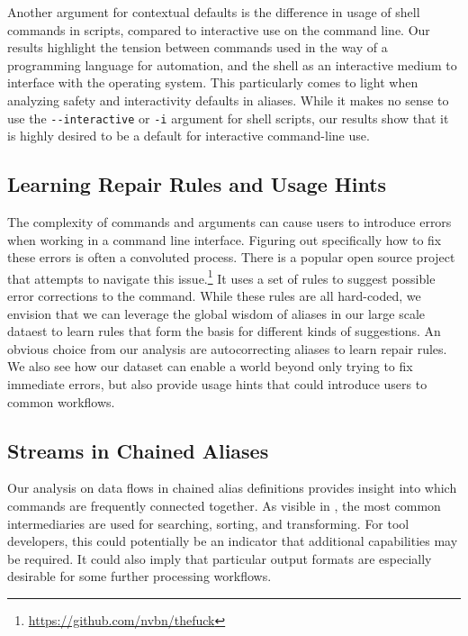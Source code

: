 Another argument for contextual defaults is the difference in usage of shell commands in scripts, compared to interactive use on the command line.
Our results highlight the tension between commands used in the way of a programming language for automation, and the shell as an interactive medium to interface with the operating system.
This particularly comes to light when analyzing safety and interactivity defaults in aliases.
While it makes no sense to use the \verb|--interactive| or \verb|-i| argument for shell scripts, our results show that it is highly desired to be a default for interactive command-line use.

\subsection{Learning Repair Rules and Usage Hints}

The complexity of commands and arguments can cause users to introduce errors when working in a command line interface.
Figuring out specifically how to fix these errors is often a convoluted process.
There is a popular open source project that attempts to navigate this issue.\footnote{\url{https://github.com/nvbn/thefuck}}
It uses a set of rules to suggest possible error corrections to the command.
While these rules are all hard-coded, we envision that we can leverage the global wisdom of aliases in our large scale dataest to learn rules that form the basis for different kinds of suggestions.
An obvious choice from our analysis are autocorrecting aliases to learn repair rules.
We also see how our dataset can enable a world beyond only trying to fix immediate errors, but also provide usage hints that could introduce users to common workflows.

\subsection{Streams in Chained Aliases}

Our analysis on data flows in chained alias definitions provides insight into which commands are frequently connected together.
As visible in , the most common intermediaries are used for searching, sorting, and transforming.
For tool developers, this could potentially be an indicator that additional capabilities may be required.
It could also imply that particular output formats are especially desirable for some further processing workflows.



